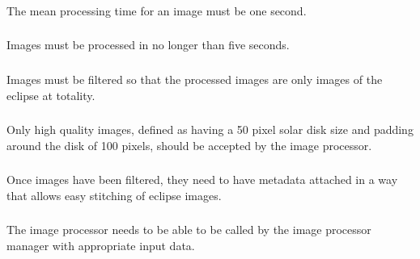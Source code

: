 \documentclass[10pt, onecolumn, draftclsnofoot, letterpaper, compsoc]{IEEEtran}
\begin{document}
\subsubsection{} 

The mean processing time for an image must be one second. \\

\subsubsection{} 

Images must be processed in no longer than five seconds.\\

\subsubsection{} 

Images must be filtered so that the processed images are only images of the
eclipse at totality.\\

\subsubsection{}

Only high quality images, defined as having a 50 pixel solar disk size and
padding around the disk of 100 pixels, should be accepted by the image
processor.\\

\subsubsection{} 

Once images have been filtered, they need to have metadata attached in a way
that allows easy stitching of eclipse images. \\

\subsubsection{} 

The image processor needs to be able to be called by the image processor manager
with appropriate input data. \\

\subsubsection{} 
\end{document}
